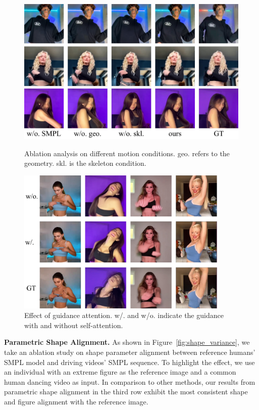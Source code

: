 \begin{figure}[!t]
  \begin{minipage}{0.48\textwidth}
     \centering
    \includegraphics[width=1.0\textwidth]{fig/guidance_ablation.jpg}
    \caption{Ablation analysis on different motion conditions. geo. refers to the geometry. skl. is the skeleton condition.}
    \label{fig:ablation_motion}
    
  \end{minipage}
  \hfill
   \begin{minipage}{0.48\textwidth}
    \centering
    \includegraphics[width=0.9\textwidth]{fig/attention_ablation.jpg}
    \caption{Effect of guidance attention. w/. and w/o. indicate the guidance with and without self-attention.}
    \label{fig:ablation_guidance}
  \end{minipage}
\end{figure}

\textbf{Parametric Shape Alignment.}
As shown in Figure~\ref{fig:shape_variance},  we take an ablation study on shape parameter alignment between reference humans' SMPL model and driving videos' SMPL sequence. To highlight the effect, we use an individual with an extreme figure as the reference image and a common human dancing video as input. In comparison to other methods, our results from parametric shape alignment in the third row exhibit the most consistent shape and figure alignment with the reference image.

